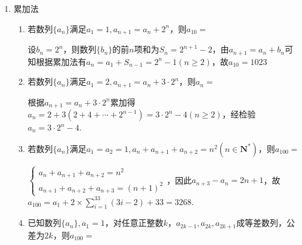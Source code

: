 \begin{enumerate}
\begin{enumerate}
          当 $r = 2$ 时，存在 ${a}_{1}$ 和正整数 $P$ ，当 $n > P$ 时， ${a}_{n + 1} - {a}_{n} < \dfrac{1}{2025}$ ；

          当 $r = 3$ 时，存在 ${a}_{1}$ 和正整数 $P$ ，当 $n > P$ 时， ${a}_{n + 1} = {a}_{n}$ ；

          当 $r =  - 3$ 时,不存在 ${a}_{1}$ ,使得对任意正整数 $n$ ,且 $n \geq  3$ ,都有 ${a}_{n} > 0$. 
        
        其中正确结论是 

        \begin{jieda}
            数形结合，结合不动点判断即可.
        \end{jieda}
    \end{enumerate}
    \item 累加法
    \begin{enumerate}
        \item 若数列$\{a_n\}$满足$a_1 = 1, a_{n+1} = a_n + 2^n$，则$a_{10} = $
        \begin{jieda}
            设$b_n = 2^n$，则数列$\{b_n\}$的前$n$项和为$S_n = 2^{n+1} - 2$，由$a_{n+1} = a_n + b_n$可知根据累加法有$a_n = a_1 + S_{n-1} = 2^n - 1(n \geq 2)$，故$a_{10} = 1023$
        \end{jieda}
        \item 若数列$\{a_n\}$满足$a_1 = 2, a_{n+1} = a_n + 3 \cdot 2^n$，则$a_n = $
        \begin{jieda}
            根据$a_{n+1} = a_n + 3 \cdot 2^n$累加得$a_n = 2 + 3(2 + 4 + \cdots + 2^{n-1}) = 3 \cdot 2^n - 4(n \geq 2)$，经检验$a_n = 3 \cdot 2^n - 4$.
        \end{jieda}
        \item 若数列$\{a_n\}$满足$a_1 = a_2 = 1, a_n + a_{n+1} + a_{n+2}= n^2 (n \in \mathbf{N^*})$，则$a_{100} = $
        \begin{jieda}
            $\left \{ \begin{array}{l}
                a_n + a_{n+1} + a_{n+2}= n^2  \\
                a_{n+1} + a_{n+2} + a_{n+3}= (n+1)^2 
            \end{array}\right.$，因此$a_{n+3} - a_n = 2n+1$，故$a_{100} = a_1 + 2 \times \sum_{i = 1}^{33}(3i-2) + 33 = 3268$.
        \end{jieda}
        \item 已知数列$\{a_n\}, a_1 = 1$，对任意正整数$k$，$a_{2k-1}, a_{2k}, a_{2k+1}$成等差数列，公差为$2k$，则$a_{100} = $

\end{enumerate}
\end{enumerate}
